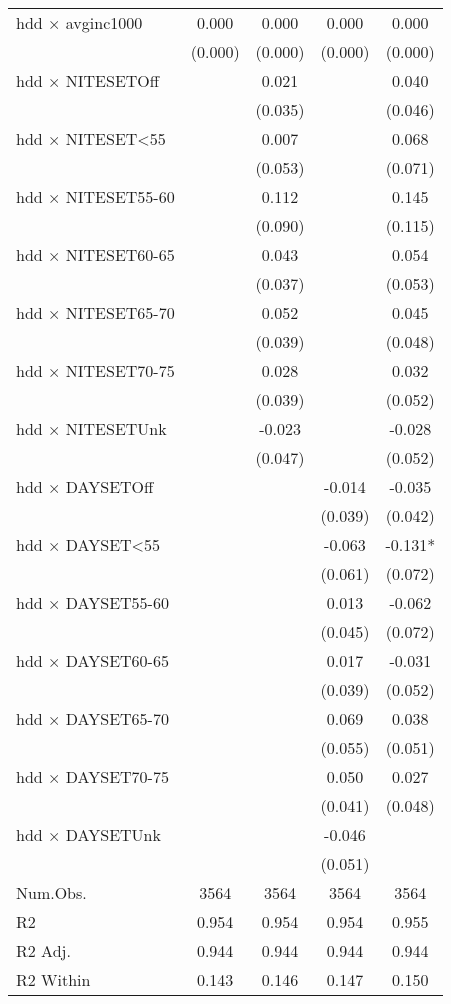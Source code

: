 \documentclass[
]{article}
\begin{document}
\begin{table}
{\begin{tabular}[t]{lcccc}
hdd × avginc1000 & 0.000 & 0.000 & 0.000 & 0.000\\
 & (0.000) & (0.000) & (0.000) & (0.000)\\
hdd × NITESETOff &  & 0.021 &  & 0.040\\
 &  & (0.035) &  & (0.046)\\
hdd × NITESET<55 &  & 0.007 &  & 0.068\\
 &  & (0.053) &  & (0.071)\\
hdd × NITESET55-60 &  & 0.112 &  & 0.145\\
 &  & (0.090) &  & (0.115)\\
hdd × NITESET60-65 &  & 0.043 &  & 0.054\\
 &  & (0.037) &  & (0.053)\\
hdd × NITESET65-70 &  & 0.052 &  & 0.045\\
 &  & (0.039) &  & (0.048)\\
hdd × NITESET70-75 &  & 0.028 &  & 0.032\\
 &  & (0.039) &  & (0.052)\\
hdd × NITESETUnk &  & -0.023 &  & -0.028\\
 &  & (0.047) &  & (0.052)\\
hdd × DAYSETOff &  &  & -0.014 & -0.035\\
 &  &  & (0.039) & (0.042)\\
hdd × DAYSET<55 &  &  & -0.063 & -0.131*\\
 &  &  & (0.061) & (0.072)\\
hdd × DAYSET55-60 &  &  & 0.013 & -0.062\\
 &  &  & (0.045) & (0.072)\\
hdd × DAYSET60-65 &  &  & 0.017 & -0.031\\
 &  &  & (0.039) & (0.052)\\
hdd × DAYSET65-70 &  &  & 0.069 & 0.038\\
 &  &  & (0.055) & (0.051)\\
hdd × DAYSET70-75 &  &  & 0.050 & 0.027\\
 &  &  & (0.041) & (0.048)\\
hdd × DAYSETUnk &  &  & -0.046 & \\
 &  &  & (0.051) & \\
\midrule
Num.Obs. & 3564 & 3564 & 3564 & 3564\\
R2 & 0.954 & 0.954 & 0.954 & 0.955\\
R2 Adj. & 0.944 & 0.944 & 0.944 & 0.944\\
R2 Within & 0.143 & 0.146 & 0.147 & 0.150\\

\end{tabular}}
\end{table}
\end{document}
